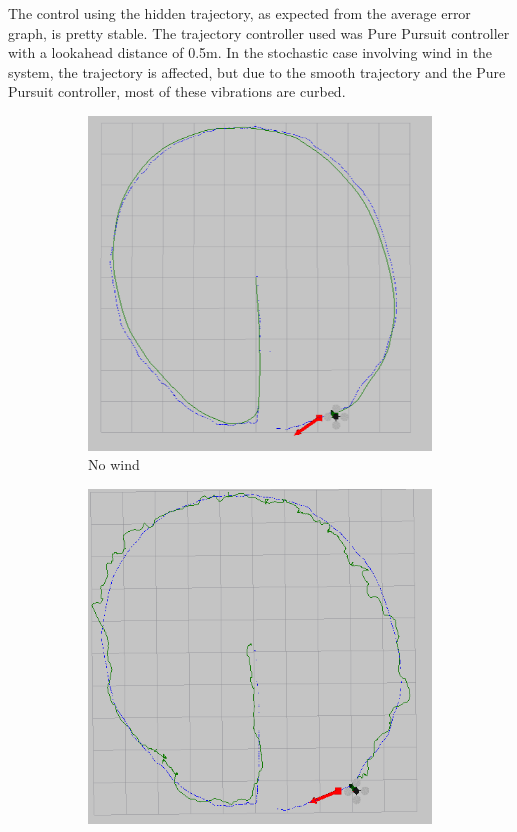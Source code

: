 \documentclass[hidelinks,BTech]{iitmdiss}
\begin{document}
The control using the hidden trajectory, as expected from the average error graph, is pretty stable. The trajectory controller used was Pure Pursuit controller with a lookahead distance of 0.5m. In the stochastic case involving wind in the system, the trajectory is affected, but due to the smooth trajectory and the Pure Pursuit controller, most of these vibrations are curbed.
\begin{figure}[H]
  \centering
  \begin{subfigure}[t]{0.48\textwidth}
  \includegraphics[width=\textwidth]{Apprenticeship_Pure_Pursuit_0_5_payload_0_1.png}
      \caption{No wind}
  \end{subfigure}
  \begin{subfigure}[t]{0.48\textwidth}
    \centering
      \includegraphics[width=\textwidth]{Apprenticeship_Pure_Pursuit_0_5_payload_0_1_wind_5.png}

\end{subfigure}
\end{figure}
\end{document}
